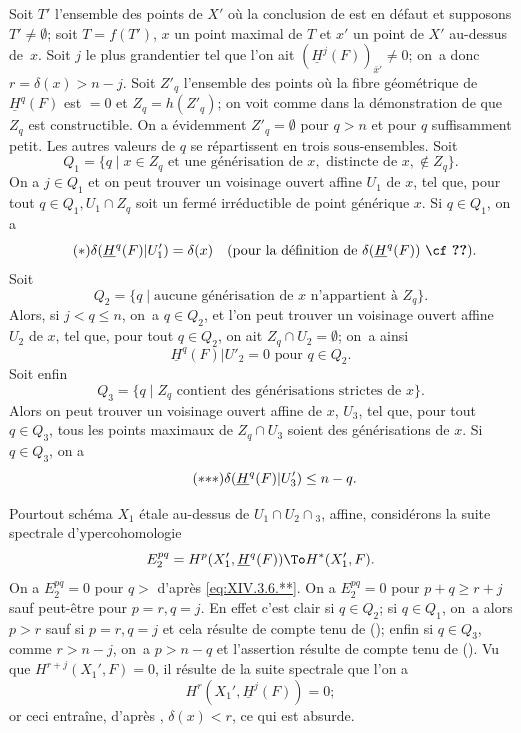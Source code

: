 Soit $T'$ l'ensemble des points de $X'$ o\`u la conclusion de  est en d\'efaut et supposons $T' \neq \emptyset$; soit $T=f(T')$, $x$ un point maximal de $T$ et $x'$ un point de $X'$ au-dessus de~$x$. Soit $j$ le plus grand\pageoriginale entier tel que l'on ait $(\underline{H}^j(F))_{\bar{x}'} \neq 0$; on~a donc $r=\delta(x)>n-j$. Soit $Z'_q$ l'ensemble des points o\`u la fibre g\'eom\'etrique de $\underline{H}^q(F)$ est $=0$ et $Z_q =h(Z'_q)$; on voit comme dans la d\'emonstration de  que $Z_q$ est constructible. On a \'evidemment $Z'_q=\emptyset$ pour $q>n$ et pour $q$ suffisamment petit. Les autres valeurs de $q$ se r\'epartissent en trois sous-ensembles. Soit
$$
Q_1=\{q\mid x\in Z_q\text{ et une g\'en\'erisation de }x, \text{ distincte de }x, \not\in Z_q\}.
$$
On a $j \in Q_1$ et on peut trouver un voisinage ouvert affine $U_1$ de $x$, tel que, pour tout $q \in Q_1, U_1 \cap Z_q$ soit un ferm\'e irr\'eductible de point g\'en\'erique $x$. Si $q \in Q_1$, on a
\begin{equation*} \label{eq:XIV.3.6.*} \tag{$*$} \delta(\underline{H}^q(F){|U_1'})=\delta(x)\quad\text{(pour la d\'efinition de $\delta(\underline{H}^q(F))$ \cf \Ref{XIV.3.1})}.
\end{equation*}
Soit
$$
Q_2=\{q\mid\text{aucune g\'en\'erisation de $x$ n'appartient \`a }Z_q\}.
$$
Alors, si $j<q\leq n$, on~a $q\in Q_2$, et l'on peut trouver un voisinage ouvert affine $U_2$ de $x$, tel que, pour tout $q \in Q_2$, on ait $Z_q \cap U_2 = \emptyset$; on~a ainsi
\begin{equation*} \label{eq:XIV.3.6.**} \tag{$**$} \underline{H}^q(F){|U'_2}=0\text{ pour }q\in Q_2.
\end{equation*}
Soit enfin
$$
Q_3= \{q\mid Z_q \text{ contient des g\'en\'erisations strictes de }x\}.
$$
Alors on peut trouver un voisinage ouvert affine de $x$, $U_3$, tel que, pour tout $q \in Q_3$, tous les points maximaux de $Z_q \cap U_3$ soient des g\'en\'erisations de $x$. Si $q \in Q_3$, on a
\begin{equation*} \label{eq:XIV.3.6.***} \tag{${*}{*}{*}$} \delta(\underline{H}^q(F){|U'_3})\leq n-q.
\end{equation*}

Pour\pageoriginale tout sch\'ema $X_1$ \'etale au-dessus de $U_1 \cap U_2 \cap {}_3$, affine, consid\'erons la suite spectrale d'ypercohomologie
$$
E^{pq}_2= H^p(X_1', \underline{H}^q(F)) \To H^*(X'_1, F).
$$
On a $E^{pq}_2=0$ pour $q>$ d'apr\`es \eqref{eq:XIV.3.6.**}. On a $E^{pq}_2=0$ pour $p+q \geq r+j$ sauf peut-\^etre pour $p=r, q=j$. En effet c'est clair si $q\in Q_2$; si $q\in Q_1$, on~a alors $p>r$ sauf si $p=r, q=j$ et cela r\'esulte de  compte tenu de (); enfin si $q\in Q_3$, comme $r>n-j$, on~a $p>n-q$ et l'assertion r\'esulte de  compte tenu de (). Vu que $H^{r+j}(X_1', F)=0$, il r\'esulte de la suite spectrale que l'on a
$$H^r(X_1', \underline{H}^j(F))=0;$$
or ceci entra\^ine, d'apr\`es , $\delta(x)<r$, ce qui est absurde.


